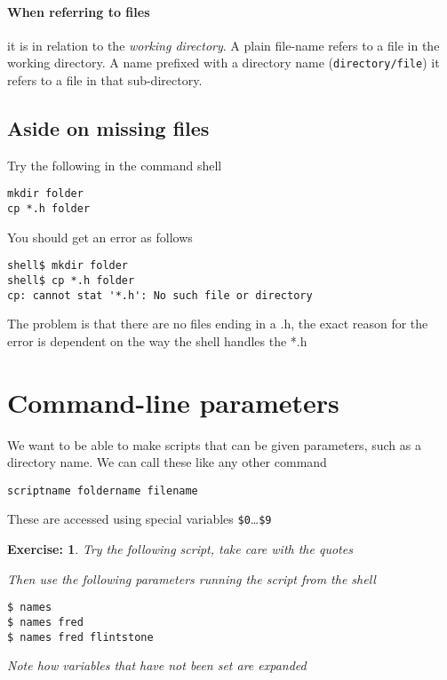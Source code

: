 \documentclass[12pt,a4paper]{article}
\newtheorem{exercise}{Exercise:}
\begin{document}
\paragraph{When referring to files} it is in relation to the \emph{working
directory}.  A plain file-name refers to a file in the working
directory.  A name prefixed with a directory name (\texttt{directory/file}) it
refers to a file in that sub-directory.

\subsection{Aside on missing files}
Try the following in the command shell
\begin{terminal}
\begin{verbatim}
mkdir folder
cp *.h folder
\end{verbatim}
\end{terminal}
You should get an error as follows
\begin{terminal}
\begin{verbatim}
shell$ mkdir folder
shell$ cp *.h folder
cp: cannot stat '*.h': No such file or directory
\end{verbatim}
\end{terminal}
The problem is that there are no files ending in a \textsf{.h}, the exact
reason for the error is dependent on the way the shell handles the \textsf{*.h}

\section{Command-line parameters }
We want to be able to make scripts that can be given parameters, such
as a directory name.  We can call these like any other command
\begin{verbatim}
scriptname foldername filename
\end{verbatim}
These are accessed using special variables
\texttt{\$0}\ldots\texttt{\$9}
\begin{exercise}
  Try the following script, take care with the quotes
  \begin{code}
  \end{code}
Then use the following parameters running the script from the shell
\begin{terminal}
\begin{verbatim}
$ names
$ names fred
$ names fred flintstone
\end{verbatim}
\end{terminal}
Note how variables that have not been set are expanded
\end{exercise}
\end{document}
